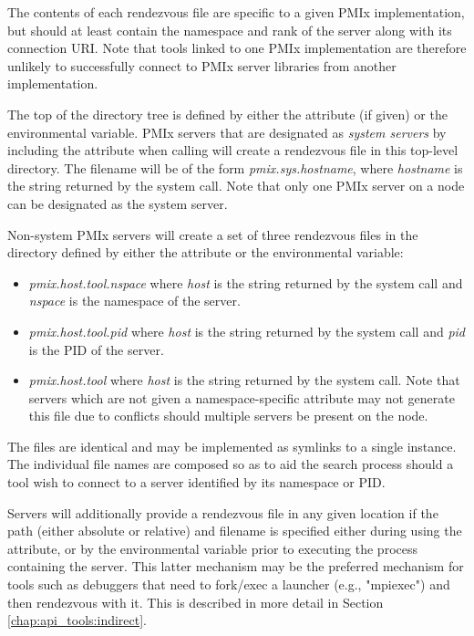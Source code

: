 The contents of each rendezvous file are specific to a given \ac{PMIx} implementation, but should at least contain the namespace and rank of the server along with its connection \ac{URI}. Note that tools linked to one \ac{PMIx} implementation are therefore unlikely to successfully connect to \ac{PMIx} server libraries from another implementation.

The top of the directory tree is defined by either the  attribute (if given) or the  environmental variable. \ac{PMIx} servers that are designated as \emph{system servers} by including the  attribute when calling  will create a rendezvous file in this top-level directory. The filename will be of the form \emph{pmix.sys.hostname}, where \emph{hostname} is the string returned by the  system call. Note that only one \ac{PMIx} server on a node can be designated as the system server.

Non-system \ac{PMIx} servers will create a set of three rendezvous files in the directory defined by either the  attribute or the  environmental variable:

\begin{itemize}
    \item \emph{pmix.host.tool.nspace} where \emph{host} is the string returned by the  system call and \emph{nspace} is the namespace of the server.
    \item \emph{pmix.host.tool.pid} where \emph{host} is the string returned by the  system call and \emph{pid} is the \ac{PID} of the server.
    \item \emph{pmix.host.tool}  where \emph{host} is the string returned by the  system call. Note that servers which are not given a namespace-specific  attribute may not generate this file due to conflicts should multiple servers be present on the node.
\end{itemize}

The files are identical and may be implemented as symlinks to a single instance. The individual file names are composed so as to aid the search process should a tool wish to connect to a server identified by its namespace or \ac{PID}.

Servers will additionally provide a rendezvous file in any given location if the path (either absolute or relative) and filename is specified either during  using the  attribute, or by the  environmental variable prior to executing the process containing the server. This latter mechanism may be the preferred mechanism for tools such as debuggers that need to fork/exec a launcher (e.g., "mpiexec") and then rendezvous with it. This is described in more detail in Section \ref{chap:api_tools:indirect}.

